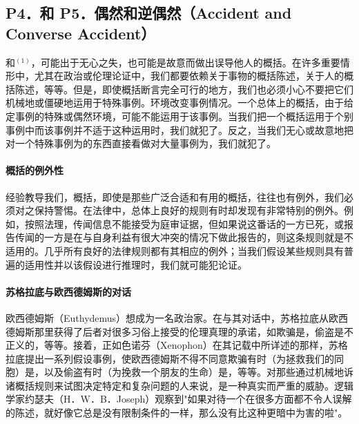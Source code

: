 \subsection{P4．和 P5．偶然和逆偶然（Accident and Converse Accident）}

\begin{theorembox}[title=偶然和逆偶然谬误的定义]
和${ }^{(1)}$，可能出于无心之失，也可能是故意而做出误导他人的概括。在许多重要情形中，尤其在政治或伦理论证中，我们都要依赖关于事物的概括陈述，关于人的概括陈述，等等。但是，即使概括断言完全可行的地方，我们也必须小心不要把它们机械地或僵硬地运用于特殊事例。环境改变事例情况。一个总体上的概括，由于给定事例的特殊或偶然环境，可能不能运用于该事例。当我们把一个概括运用于个别事例中而该事例并不适于这种运用时，我们就犯了。反之，当我们无心或故意地把对一个特殊事例为的东西直接看做对大量事例为，我们就犯了。
\end{theorembox}

\paragraph{概括的例外性}
\begin{examplebox}[title=概括的例外性]
经验教导我们，概括，即使是那些广泛合适和有用的概括，往往也有例外，我们必须对之保持警惕。在法律中，总体上良好的规则有时却发现有非常特别的例外。例如，按照法理，传闻信息不能接受为庭审证据，但如果说这番话的一方已死，或报告传闻的一方是在与自身利益有很大冲突的情况下做此报告的，则这条规则就是不适用的。几乎所有良好的法律规则都有其相应的例外；当我们假设某些规则具有普遍的适用性并以该假设进行推理时，我们就可能犯论证。
\end{examplebox}

\paragraph{苏格拉底与欧西德姆斯的对话}
\begin{examplebox}[title=苏格拉底与欧西德姆斯的对话]
欧西德姆斯（Euthydemus）想成为一名政治家。在与其对话中，苏格拉底从欧西德姆斯那里获得了后者对很多习俗上接受的伦理真理的承诺，如欺骗是，偷盗是不正义的，等等。接着，正如色诺芬（Xenophon）在其记载中所详述的那样，苏格拉底提出一系列假设事例，使欧西德姆斯不得不同意欺骗有时（为拯救我们的同胞）是，以及偷盗有时（为挽救一个朋友的生命）是，等等。对那些通过机械地诉诸概括规则来试图决定特定和复杂问题的人来说，是一种真实而严重的威胁。逻辑学家约瑟夫（H．W．B．Joseph）观察到"如果对待一个在很多方面都不令人误解的陈述，就好像它总是没有限制条件的一样，那么没有比这种更暗中为害的啦"。
\end{examplebox}


